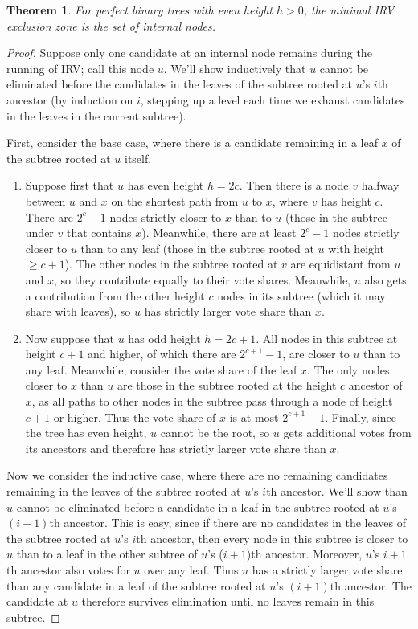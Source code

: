 \documentclass{article}
\theoremstyle{theorem}
\newtheorem{theorem}{Theorem}
\theoremstyle{definition}
\begin{document}
\begin{theorem}
  For perfect binary trees with even height $h > 0$, the minimal IRV exclusion zone is the set of internal nodes.
\end{theorem}
\begin{proof}
Suppose only one candidate at an internal node remains during the running of IRV; call this node $u$. We'll show inductively that $u$ cannot be eliminated before the candidates in the leaves of the subtree rooted at $u$'s $i$th ancestor (by induction on $i$, stepping up a level each time we exhaust candidates in the leaves in the current subtree). 

First, consider the base case, where there is a candidate remaining in a leaf $x$ of the subtree rooted at $u$ itself. 
\begin{enumerate}
  \item Suppose first that $u$ has even height $h = 2c$. Then there is a node $v$ halfway between $u$ and $x$ on the shortest path from $u$ to $x$, where $v$ has height $c$. There are $2^{c}-1$ nodes strictly closer to $x$ than to $u$ (those in the subtree under $v$ that contains $x$). Meanwhile, there are at least $2^{c}-1$ nodes strictly closer to $u$ than to any leaf (those in the subtree rooted at $u$ with height $\ge c+1$). The other nodes in the subtree rooted at $v$ are equidistant from $u$ and $x$, so they contribute equally to their vote shares. Meanwhile, $u$ also gets a contribution from the other height $c$ nodes in its subtree (which it may share with leaves), so $u$ has strictly larger vote share than $x$.
  \item Now suppose that $u$ has odd height $h = 2c+1$. All nodes in this subtree at height $c+1$ and higher, of which there are $2^{c+1} - 1$, are closer to $u$ than to any leaf. Meanwhile, consider the vote share of the leaf $x$. The only nodes closer to $x$ than $u$ are those in the subtree rooted at the height $c$ ancestor of $x$, as all paths to other nodes in the subtree pass through a node of height $c+1$ or higher. Thus the vote share of $x$ is at most $2^{c+1} -1$. Finally, since the tree has even height, $u$ cannot be the root, so $u$ gets additional votes from its ancestors and therefore has strictly larger vote share than $x$.
\end{enumerate}

Now we consider the inductive case, where there are no remaining candidates remaining in the leaves of the subtree rooted at $u$'s $i$th ancestor. We'll show than $u$ cannot be eliminated before a candidate in a leaf in the subtree rooted at $u$'s $(i+1)$th ancestor. This is easy, since if there are no candidates in the leaves of the subtree rooted at $u$'s $i$th ancestor, then every node in this subtree is closer to $u$ than to a leaf in the other subtree of $u$'s ($i+1$)th ancestor. Moreover, $u$'s $i+1$th ancestor also votes for $u$ over any leaf. Thus $u$ has a strictly larger vote share than any candidate in a leaf of the subtree rooted at $u$'s $(i+1)$th ancestor. The candidate at $u$ therefore survives elimination until no leaves remain in this subtree.


\end{proof}
\end{document}
